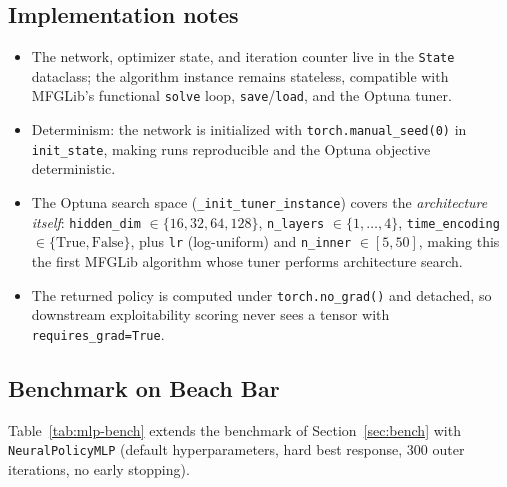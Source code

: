 \documentclass[11pt,a4paper]{article}
\begin{document}
\subsection{Implementation notes}
\begin{itemize}
  \item The network, optimizer state, and iteration counter live in the
        \texttt{State} dataclass; the algorithm instance remains stateless,
        compatible with MFGLib's functional \texttt{solve} loop, \texttt{save}/\texttt{load},
        and the Optuna tuner.
  \item Determinism: the network is initialized with \texttt{torch.manual\_seed(0)}
        in \texttt{init\_state}, making runs reproducible and the Optuna
        objective deterministic.
  \item The Optuna search space (\texttt{\_init\_tuner\_instance}) covers the
        \emph{architecture itself}: \texttt{hidden\_dim} $\in \{16, 32, 64,
        128\}$, \texttt{n\_layers} $\in \{1,\dots,4\}$,
        \texttt{time\_encoding} $\in \{\text{True}, \text{False}\}$, plus
        \texttt{lr} (log-uniform) and \texttt{n\_inner} $\in [5, 50]$, making
        this the first MFGLib algorithm whose tuner performs architecture
        search.
  \item The returned policy is computed under \texttt{torch.no\_grad()} and
        detached, so downstream exploitability scoring never sees a tensor
        with \texttt{requires\_grad=True}.
\end{itemize}

\subsection{Benchmark on Beach Bar}
Table~\ref{tab:mlp-bench} extends the benchmark of Section~\ref{sec:bench}
with \texttt{NeuralPolicyMLP} (default hyperparameters, hard best response,
300 outer iterations, no early stopping).
\end{document}
